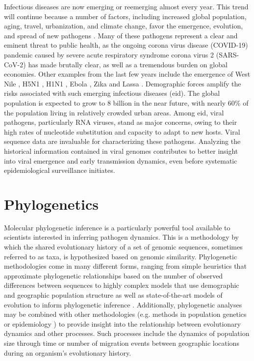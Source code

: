 Infectious diseases are now emerging or reemerging almost every year.
This trend will continue because a number of factors, including increased global population, aging, travel, urbanization, and climate change, favor the emergence, evolution, and spread of new pathogens \cite{bloom2017emerging}.
Many of these pathogens represent a clear and eminent threat to public health, as the ongoing corona virus disease (COVID-19) pandemic caused by severe acute respiratory syndrome corona virus 2 (SARS-CoV-2) has made brutally clear, as well as a tremendous burden on global economies.
Other examples from the last few years include the emergence of West Nile \cite{hadfield2019twenty}, H5N1 \cite{imai2018diversity}, H1N1 \cite{bedford2015global}, Ebola \cite{dudas2017virus}, Zika \cite{fauci2016zika, faria2016zika} and Lassa \cite{kafetzopoulou2019metagenomic}.
Demographic forces amplify the risks associated with such emerging infectious diseases (\gls{eid}).
The global population is expected to grow to 8 billion in the near future, with nearly 60\% of the population living in relatively crowded urban areas.
Among \gls{eid}, viral pathogens, particularly RNA viruses, stand as major concerns, owing to their high rates of nucleotide substitution and capacity to adapt to new hosts.
Viral sequence data are invaluable for characterizing these pathogens.
Analyzing the historical information contained in viral genomes contributes to better insight into viral emergence and early transmission dynamics, even before systematic epidemiological surveillance initiates.

\section{Phylogenetics}

Molecular phylogenetic inference is a particularly powerful tool available to scientists interested in inferring pathogen dynamics.
This is a methodology by which the shared evolutionary history of a set of genomic sequences, sometimes referred to as taxa, is hypothesized based on genomic similarity.
Phylogenetic methodologies come in many different forms, ranging from simple heuristics that approximate phylogenetic relationships based on the number of observed differences between sequences \cite{felsenstein2003inferring} to highly complex models that use demographic and geographic population structure as well as state-of-the-art models of evolution to inform phylogenetic inference \cite{dudas2018mers}.
Additionally, phylogenetic analyses may be combined with other methodologies (e.g. methods in population genetics \cite{felsenstein2003inferring} or epidemiology \cite{black2020ten}) to provide insight into the relationship between evolutionary dynamics and other processes.
Such processes include the dynamics of population size through time or number of migration events between geographic locations during an organism's evolutionary history.

